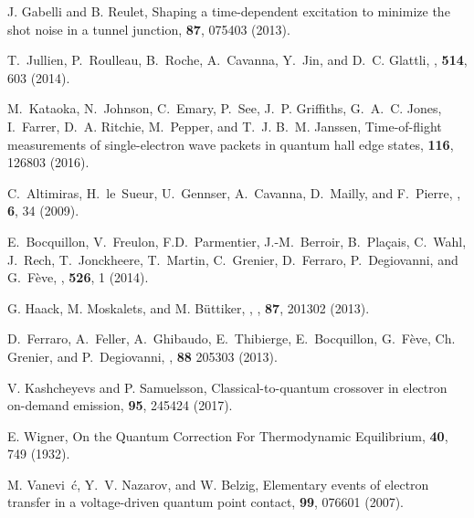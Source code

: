 \documentclass[aps,prb,superscriptaddress,preprint]{revtex4-1}
\begin{document}
\begin{thebibliography}{1}
		
		J. Gabelli and B. Reulet,
		\newblock Shaping a time-dependent excitation to minimize the shot noise in a
		tunnel junction,
		 {\bf 87}, 075403 (2013).
		
		T.~Jullien, P.~Roulleau, B.~Roche, A.~Cavanna, Y.~Jin, and D.~C. Glattli,
		,
		 {\bf 514}, 603 (2014).
		
		
		M.~Kataoka, N.~Johnson, C.~Emary, P.~See, J.~P. Griffiths, G.~A.~C. Jones,
		I.~Farrer, D.~A. Ritchie, M.~Pepper, and T.~J. B.~M. Janssen,
		\newblock Time-of-flight measurements of single-electron wave packets in
		quantum hall edge states,
		 {\bf 116}, 126803 (2016).
		
		C.~Altimiras, H.~le~Sueur, U.~Gennser, A.~Cavanna, D.~Mailly, and F.~Pierre,
		,
		 {\bf 6}, 34 (2009).
		
		E.~Bocquillon, V.~Freulon, F.D.~Parmentier, J.-M.~Berroir, B.~Pla\c{c}ais, C.~Wahl, J.~Rech, T.~Jonckheere, T.~Martin, C.~Grenier,
		D.~Ferraro, P.~Degiovanni, and G.~F\`{e}ve,
		,
		  {\bf 526}, 1 (2014).
		
		G. Haack, M. Moskalets, and M. B\"uttiker,
		,
		, {\bf 87}, 201302 (2013).
		
		
		
		D.~Ferraro, A.~Feller, A.~Ghibaudo, E.~Thibierge, E.~Bocquillon, G.~F{\`e}ve,
		Ch. Grenier, and P.~Degiovanni,
		,
		 {\bf 88} 205303 (2013).
		
		V. Kashcheyevs and P. Samuelsson,
		\newblock Classical-to-quantum crossover in electron on-demand emission,
		 {\bf 95}, 245424 (2017).
		
		E. Wigner, On the Quantum Correction For Thermodynamic Equilibrium,  {\bf 40}, 749 (1932).
		
		
		M. Vanevi\ifmmode~\else \'{c}\fi{}, Y.~V. Nazarov, and W.
		Belzig,
		\newblock Elementary events of electron transfer in a voltage-driven quantum
		point contact,
		 {\bf 99}, 076601 (2007).
		

\end{thebibliography}
\end{document}
